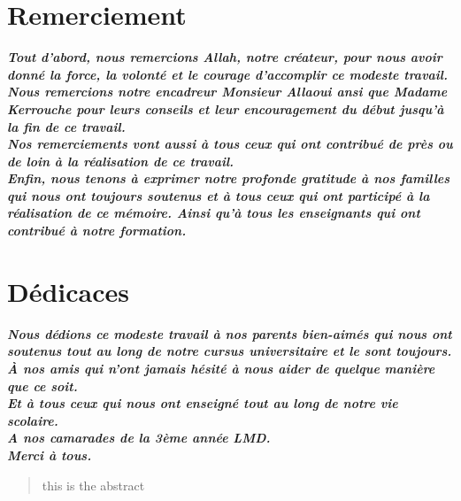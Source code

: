 \documentclass[french, a4paper, 12pt]{report}
\begin{document}
\chapter*{Remerciement}
\begin{center}
\Large \textbf{\textit{Tout d'abord, nous remercions Allah, notre créateur, pour nous avoir donné la force, la volonté et le courage d'accomplir ce modeste travail.\\
Nous remercions notre encadreur Monsieur Allaoui ansi que Madame Kerrouche pour leurs conseils et leur encouragement du début jusqu'à la fin de ce travail.\\
Nos remerciements vont aussi à tous ceux qui ont contribué de près ou de loin à la réalisation de ce travail.\\Enfin, nous tenons à exprimer notre profonde gratitude à nos familles qui nous ont toujours soutenus et à tous ceux qui ont participé à la réalisation de ce mémoire. Ainsi qu'à tous les enseignants qui ont contribué à notre formation.}}
\end{center}

\chapter*{Dédicaces}
\begin{center}
\Large \textbf{\textit{Nous dédions ce modeste travail à nos parents bien-aimés qui nous ont soutenus tout au long de notre cursus universitaire et le sont toujours.\\
À nos amis qui n'ont jamais hésité à nous aider de quelque manière que ce soit.\\
Et à tous ceux qui nous ont enseigné tout au long de notre vie scolaire.\\
A nos camarades de la 3ème année LMD.\\
Merci à tous.}}
\end{center}

\newpage
\begin{abstract}
this is the abstract
\end{abstract}


\tableofcontents

\newpage
\listoffigures

\newpage
\listoftables


\newpage
\end{document}
